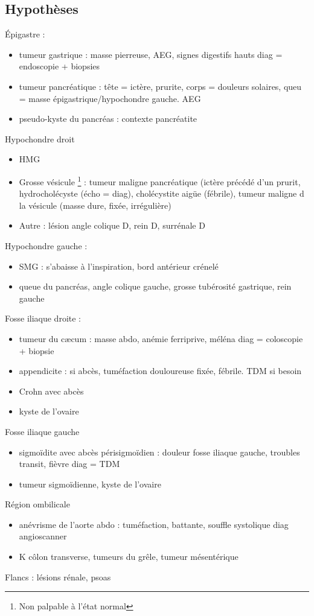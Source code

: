 \documentclass[11pt]{article}
\begin{document}
\subsection{Hypothèses}
\label{sec:org31e5f9f}
Épigastre :
\begin{itemize}
\item tumeur gastrique : masse pierreuse, AEG, signes digestifs hauts \thus diag =
endoscopie + biopsies
\item tumeur pancréatique : tête = ictère, prurite, corps = douleurs solaires, queu
= masse épigastrique/hypochondre gauche. AEG
\item pseudo-kyste du pancréas : contexte pancréatite
\end{itemize}
Hypochondre droit
\begin{itemize}
\item HMG
\item Grosse vésicule \footnote{Non palpable à l'état normal} : tumeur maligne pancréatique (ictère précédé d'un
prurit, hydrocholécyste (écho = diag), cholécystite aigüe (fébrile), tumeur
maligne d la vésicule (masse dure, fixée, irrégulière)
\item Autre : lésion angle colique D, rein D, surrénale D
\end{itemize}
Hypochondre gauche :
\begin{itemize}
\item \gls{SMG} : s'abaisse à l'inspiration, bord antérieur crénelé
\item queue du pancréas, angle colique gauche, grosse tubérosité gastrique, rein
gauche
\end{itemize}
Fosse iliaque droite :
\begin{itemize}
\item tumeur du c\ae{}cum : masse abdo, anémie ferriprive, méléna \thus diag =
coloscopie + biopsie
\item appendicite : si abcès, tuméfaction douloureuse fixée, fébrile. TDM si besoin
\item Crohn avec abcès
\item kyste de l'ovaire
\end{itemize}
Fosse iliaque gauche
\begin{itemize}
\item sigmoïdite avec abcès périsigmoïdien : douleur fosse iliaque gauche, troubles
transit, fièvre \thus diag = TDM
\item tumeur sigmoïdienne, kyste de l'ovaire
\end{itemize}
Région ombilicale
\begin{itemize}
\item anévrisme de l'aorte abdo : tuméfaction, battante, souffle systolique \thus
diag  angioscanner
\item K côlon transverse, tumeurs du grêle, tumeur mésentérique
\end{itemize}
Flancs : lésions rénale, psoas
\end{document}
